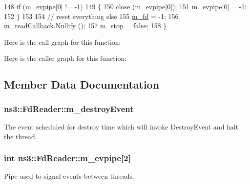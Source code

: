 \begin{DoxyCode}
148   \textcolor{keywordflow}{if} (\hyperlink{classns3_1_1FdReader_a0c4a678111029fdc40948d4d7657aa41}{m\_evpipe}[0] != -1)
149     \{
150       close (\hyperlink{classns3_1_1FdReader_a0c4a678111029fdc40948d4d7657aa41}{m\_evpipe}[0]);
151       \hyperlink{classns3_1_1FdReader_a0c4a678111029fdc40948d4d7657aa41}{m\_evpipe}[0] = -1;
152     \}
153 
154   \textcolor{comment}{// reset everything else}
155   \hyperlink{classns3_1_1FdReader_ad0883be1c0ebac30885c17c0cc17076d}{m\_fd} = -1;
156   \hyperlink{classns3_1_1FdReader_af5cd7136ecc802487df40cd8046d6fe1}{m\_readCallback}.\hyperlink{classns3_1_1Callback_ab24de4ac458fc5b1ac6f7a672c4c6cea}{Nullify} ();
157   \hyperlink{classns3_1_1FdReader_a53bb467852fcfe1a12dd0e32f846b01e}{m\_stop} = \textcolor{keyword}{false};
158 \}
\end{DoxyCode}


Here is the call graph for this function\+:




Here is the caller graph for this function\+:




\subsection{Member Data Documentation}
\subsubsection[{\texorpdfstring{m\+\_\+destroy\+Event}{m_destroyEvent}}]{ ns3\+::\+Fd\+Reader\+::m\+\_\+destroy\+Event\hspace{0.3cm}{\ttfamily [private]}}\hypertarget{classns3_1_1FdReader_a9f3cee67eb1d43aa53ebc23384e32828}{}\label{classns3_1_1FdReader_a9f3cee67eb1d43aa53ebc23384e32828}
The event scheduled for destroy time which will invoke Destroy\+Event and halt the thread. 
\subsubsection[{\texorpdfstring{m\+\_\+evpipe}{m_evpipe}}]{\setlength{\rightskip}{0pt plus 5cm}int ns3\+::\+Fd\+Reader\+::m\+\_\+evpipe\mbox{[}2\mbox{]}\hspace{0.3cm}{\ttfamily [private]}}\hypertarget{classns3_1_1FdReader_a0c4a678111029fdc40948d4d7657aa41}{}\label{classns3_1_1FdReader_a0c4a678111029fdc40948d4d7657aa41}
Pipe used to signal events between threads. 
